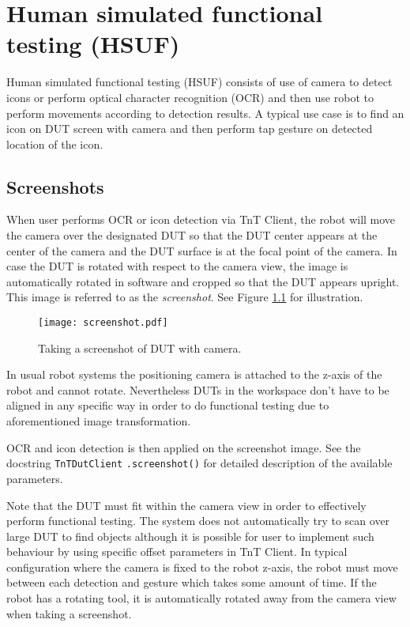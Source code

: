 \chapter{Human simulated functional testing (HSUF)}

Human simulated functional testing (HSUF) consists of use of camera to detect icons or perform optical character recognition (OCR) and then use
robot to perform movements according to detection results. A typical use case is to find an icon on DUT screen with camera and then perform tap gesture on detected location of the icon.


\section{Screenshots}

When user performs OCR or icon detection via TnT Client, the robot will move the camera over the designated DUT so that the DUT center appears at the center of the camera and the DUT surface is at the focal point of the camera. In case the DUT is rotated with respect to the camera view, the image is automatically rotated in software and cropped so that the DUT appears upright. This image is referred to as the \emph{screenshot}. See Figure \ref{fig:screenshot} for illustration.

\begin{figure}[h]
	\centering
	\texttt{[image: screenshot.pdf]}
	\caption{Taking a screenshot of DUT with camera.}
	\label{fig:screenshot}
\end{figure}

In usual robot systems the positioning camera is attached to the z-axis of the robot and cannot rotate. Nevertheless DUTs in the workspace don't have to be aligned in any specific way in order to do functional testing due to aforementioned image transformation. 

OCR and icon detection is then applied on the screenshot image. See the docstring \texttt{TnTDutClient} \texttt{.screenshot()} for detailed description of the available parameters.

Note that the DUT must fit within the camera view in order to effectively perform functional testing. The system does not automatically try to scan over large DUT to find objects although it is possible for user to implement such behaviour by using specific offset parameters in TnT Client. In typical configuration where the camera is fixed to the robot z-axis, the robot must move between each detection and gesture which takes some amount of time. If the robot has a rotating tool, it is automatically rotated away from the camera view when taking a screenshot.

